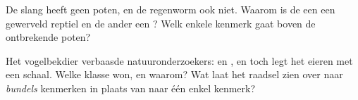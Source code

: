 \begin{exercise}[$\star\star$]\label{exo:g4:classifying-animals:10}
De slang heeft geen poten, en de regenworm ook niet. Waarom is de een
een gewerveld reptiel en de ander een ? Welk enkele
kenmerk gaat boven de ontbrekende poten?
\end{exercise}

\begin{exercise}[$\star\star\star$]\label{exo:g4:classifying-animals:11}
Het vogelbekdier verbaasde natuuronderzoekers:  en , en toch
legt het eieren met een schaal. Welke klasse won, en waarom? Wat laat
het raadsel zien over  naar \emph{bundels} kenmerken in
plaats van naar één enkel kenmerk?
\end{exercise}
